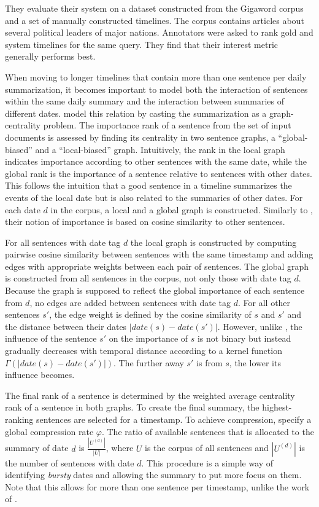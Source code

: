 \documentclass[a4paper,BCOR=10mm]{report}
\numberwithin{lemma}{chapter}
\numberwithin{definition}{chapter}
\begin{document}
They evaluate their system on a dataset constructed from the Gigaword corpus \citep{gigaword} and a set of manually constructed timelines. The corpus contains articles about several political leaders of major nations. Annotators were asked to rank gold and system timelines for the same query.
They find that their interest metric generally performs best.

When moving to longer timelines that contain more than one sentence per daily summarization, it becomes important to model both the interaction of sentences within the same daily summary and the interaction between summaries of different dates.
\citet{yan-trans} model this relation by casting the summarization as a graph-centrality problem.
The importance rank of a sentence from the set of input documents is assessed by finding its centrality in two sentence graphs, a ``global-biased'' and a ``local-biased'' graph.
Intuitively, the rank in the local graph indicates importance according to other sentences with the same date, while the global rank is the importance of a sentence relative to sentences with other dates. This follows the intuition that a good sentence in a timeline summarizes the events of the local date but is also related to the summaries of other dates. For each date $d$ in the corpus, a local and a global graph is constructed.
Similarly to \citet{chieu}, their notion of importance is based on cosine similarity to other sentences.

For all sentences with date tag $d$ the local graph is constructed by computing pairwise cosine similarity between sentences with the same timestamp and adding edges with appropriate weights between each pair of sentences.
The global graph is constructed from all sentences in the corpus, not only those with date tag $d$. Because the graph is supposed to reflect the global importance of each sentence from $d$, no edges are added between sentences with date tag $d$.
For all other sentences $s'$, the edge weight is defined by the cosine similarity of $s$ and $s'$ and the distance between their dates $|\mathit{date}(s) - \mathit{date}(s')|$. However, unlike \citet{chieu}, the influence of the sentence $s'$ on the importance of $s$ is not binary but instead gradually decreases with temporal distance according to a kernel function $\Gamma(|\mathit{date}(s) - \mathit{date}(s')|)$. The further away $s'$ is from $s$, the lower its influence becomes.

The final rank of a sentence is determined by the weighted average centrality rank of a sentence in both graphs.
To create the final summary, the highest-ranking sentences are selected for a timestamp. To achieve compression, \citeauthor{yan-trans} specify a global compression rate $\varphi$. The ratio of available sentences that is allocated to the summary of date $d$ is $\frac{|U^{(d)}|}{|U|}$, where $U$ is the corpus of all sentences and $|U^{(d)}|$ is the number of sentences with date $d$.
This procedure is a simple way of identifying \textit{bursty} dates and allowing the summary to put more focus on them.
Note that this allows for more than one sentence per timestamp, unlike the work of \citet{chieu}.
\end{document}

